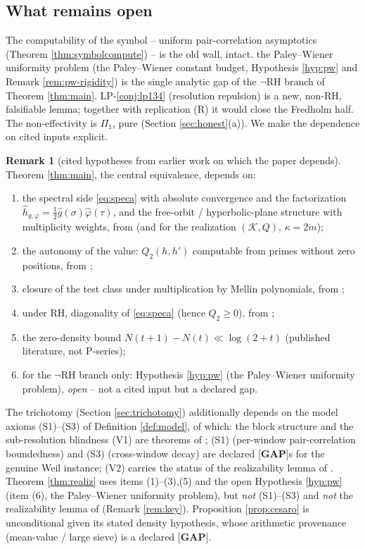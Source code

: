 \documentclass[11pt,reqno]{amsart}
\theoremstyle{definition}
\newtheorem{remark}[theorem]{Remark}
\newcommand{\half}{\tfrac12}
\newcommand{\GAP}{\textbf{[GAP]}}
\begin{document}
\subsection{What remains open}
The computability of the symbol -- uniform pair-correlation asymptotics (Theorem
\ref{thm:symbolcompute}) -- is the old wall, intact. the Paley--Wiener uniformity problem (the
Paley--Wiener constant budget, Hypothesis \ref{hyp:pw} and Remark
\ref{rem:pw-rigidity}) is the single analytic gap of the \(\neg\)RH branch of
Theorem \ref{thm:main}. LP-\ref{conj:lp134}
(resolution repulsion) is a new, non-RH, falsifiable lemma; together with
replication (R) it would close the Fredholm half. The non-effectivity is
\(\Pi_1\), pure (Section \ref{sec:honest}(a)). We make the dependence on cited
inputs explicit.

\begin{remark}[cited hypotheses from earlier work on which the paper
depends]\label{rem:deps}
\textup{Theorem \ref{thm:main}}, the central equivalence, depends on:
\begin{enumerate}
\item the spectral side \eqref{eq:speca} with absolute convergence and the
factorization \(\hat h_{g,\varphi}=\half\hat g(\sigma)\hat\varphi(\tau)\), and
the free-orbit / hyperbolic-plane structure with multiplicity weights, from
\cite{P40} (and \cite{P35} for the realization \((\mathcal K,Q)\),
\(\kappa=2m\));
\item the autonomy of the value: \(Q_2(h,h')\) computable from primes without
zero positions, from \cite{P39,P35};
\item closure of the test class under multiplication by Mellin polynomials,
from \cite{P40};
\item under RH, diagonality of \eqref{eq:speca} (hence \(Q_2\geq0\)), from
\cite{P40};
\item the zero-density bound \(N(t+1)-N(t)\ll\log(2+t)\)
\cite[Thm.\ 5.8]{IwaniecKowalski} (published literature, not P-series);
\item for the \(\neg\)RH branch only: Hypothesis \ref{hyp:pw} (the Paley--Wiener uniformity problem),
\emph{open} -- not a cited input but a declared gap.
\end{enumerate}
\textup{The trichotomy (Section \ref{sec:trichotomy})} additionally depends on
the model axioms (S1)--(S3) of Definition \ref{def:model}, of which: the block
structure and the sub-resolution blindness (V1) are theorems of \cite{P40}; (S1)
(per-window pair-correlation boundedness) and (S3) (cross-window decay) are
declared \(\GAP\)s for the genuine Weil instance; (V2) carries the status of the
realizability lemma of \cite{P40}. \textup{Theorem \ref{thm:realiz}} uses items
(1)--(3),(5) and the open Hypothesis \ref{hyp:pw} (item (6), the Paley--Wiener uniformity problem),
but \emph{not} (S1)--(S3) and \emph{not} the realizability
lemma of \cite{P40} (Remark \ref{rem:key}). \textup{Proposition
\ref{prop:cesaro}} is unconditional given its stated density hypothesis, whose
arithmetic provenance (mean-value / large sieve) is a declared \(\GAP\).
\end{remark}
\end{document}
